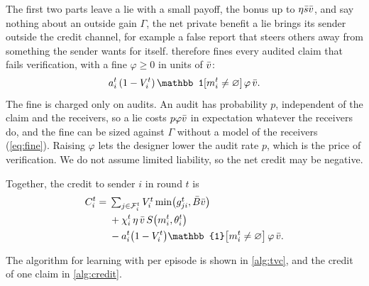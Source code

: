 The first two parts leave a lie with a small payoff, the bonus up to $\eta\bar s\bar v$, and say nothing about an outside gain $\Gamma$, the net private benefit a lie brings its sender outside the credit channel, for example a false report that steers others away from something the sender wants for itself. \tvc{} therefore fines every audited claim that fails verification, with a fine $\varphi\ge0$ in units of $\bar v$:
\begin{equation}
  a_i^t\,(1-V_i^t)\,\mathbb 1[m_i^t\neq\varnothing]\,\varphi\,\vbar.
  \label{eq:cost}
\end{equation}
The fine is charged only on audits. An audit has probability $p$, independent of the claim and the receivers, so a lie costs $p\varphi\bar v$ in expectation whatever the receivers do, and the fine can be sized against $\Gamma$ without a model of the receivers (\cref{eq:fine}). Raising $\varphi$ lets the designer lower the audit rate $p$, which is the price of verification. We do not assume limited liability, so the net credit may be negative.



Together, the credit to sender $i$ in round $t$ is
\begin{equation}
  \begin{aligned}
    C_i^t ={}& \textstyle\sum_{j\in\mathcal F_i^t} V_i^t \min\!\big(g_{ji}^t,\Bbar\vbar\big) \\
    &+ \chi_i^t\,\eta\,\vbar\, S\big(m_i^t,\theta_i^t\big) \\
    &- a_i^t\big(1-V_i^t\big)\mathbb{1}\big[m_i^t\neq\varnothing\big]\,\varphi\,\vbar .
  \end{aligned}
  \label{eq:tvc}
\end{equation}

The algorithm for learning with \tvc{} per episode is shown in \cref{alg:tvc}, and the credit of one claim in \cref{alg:credit}.





